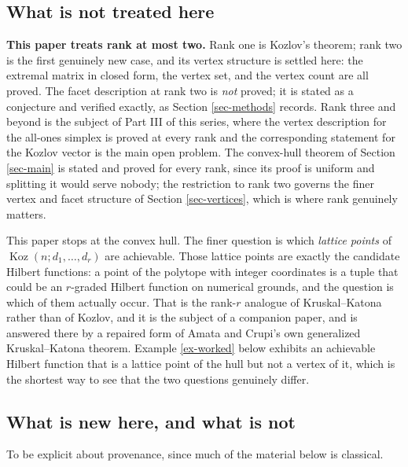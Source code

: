 \documentclass[11pt, a4paper, abstract=yes]{scrartcl}
\theoremstyle{definition}
\theoremstyle{remark}
\theoremstyle{plain}
\newcommand{\Koz}{\operatorname{Koz}}
\begin{document}
\subsection{What is not treated here}
\label{sec-scope}
\textbf{This paper treats rank at most two.} Rank one is Kozlov's theorem; rank two is the first genuinely
new case, and its vertex structure is settled here: the extremal matrix in closed form, the vertex
set, and the vertex count are all proved. The facet description at rank two is \emph{not} proved; it is
stated as a conjecture and verified exactly, as Section \ref{sec-methods} records. Rank three and beyond is the subject of
Part III of this series, where the vertex description for the all-ones simplex is proved at every
rank and the corresponding statement for the Kozlov vector is the main open problem. The convex-hull
theorem of Section \ref{sec-main} is stated and proved for every rank, since its proof is uniform and
splitting it would serve nobody; the restriction to rank two governs the finer vertex and facet
structure of Section \ref{sec-vertices}, which is where rank genuinely matters.


This paper stops at the convex hull. The finer question is which \emph{lattice points} of
\(\Koz(n;d_1,\dots,d_r)\) are achievable. Those lattice points are exactly the candidate Hilbert
functions: a point of the polytope with integer coordinates is a tuple that could be an
\(r\)-graded Hilbert function on numerical grounds, and the question is which of them actually
occur. That is the rank-\(r\) analogue of Kruskal--Katona rather than of Kozlov, and it is the
subject of a companion paper, and is answered there by a repaired form of Amata and
Crupi's own generalized Kruskal--Katona theorem. Example \ref{ex-worked} below exhibits an achievable
Hilbert function that is a lattice point of the hull but not a vertex of it, which is the shortest
way to see that the two questions genuinely differ.
\subsection{What is new here, and what is not}
\label{sec:orga28260e}

To be explicit about provenance, since much of the material below is classical.
\end{document}
